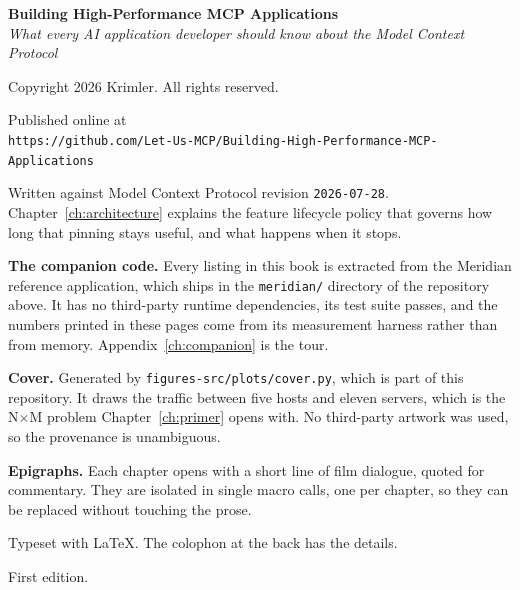 \thispagestyle{empty}
\vspace*{\fill}

\begin{flushleft}
{\sffamily\small

\textbf{Building High-Performance MCP Applications}\\
\emph{What every AI application developer should know about the Model Context Protocol}

\vspace{12pt}
Copyright \textcopyright{} 2026 Krimler. All rights reserved.

\vspace{12pt}
Published online at\\
\texttt{https://github.com/Let-Us-MCP/Building-High-Performance-MCP-Applications}

\vspace{12pt}
Written against Model Context Protocol revision \texttt{2026-07-28}.
Chapter~\ref{ch:architecture} explains the feature lifecycle policy that
governs how long that pinning stays useful, and what happens when it stops.

\vspace{12pt}
\textbf{The companion code.} Every listing in this book is extracted from the
Meridian reference application, which ships in the \texttt{meridian/} directory
of the repository above. It has no third-party runtime dependencies, its test
suite passes, and the numbers printed in these pages come from its measurement
harness rather than from memory. Appendix~\ref{ch:companion} is the tour.

\vspace{12pt}
\textbf{Cover.} Generated by \texttt{figures-src/plots/cover.py}, which is part
of this repository. It draws the traffic between five hosts and eleven servers,
which is the N${\times}$M problem Chapter~\ref{ch:primer} opens with. No
third-party artwork was used, so the provenance is unambiguous.

\vspace{12pt}
\textbf{Epigraphs.} Each chapter opens with a short line of film dialogue,
quoted for commentary. They are isolated in single macro calls, one per
chapter, so they can be replaced without touching the prose.

\vspace{12pt}
Typeset with \LaTeX{}. The colophon at the back has the details.

\vspace{12pt}
First edition.
}
\end{flushleft}

\cleardoublepage
